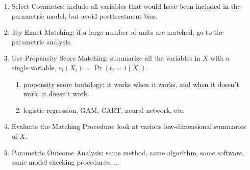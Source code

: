 \documentclass[20pt,landscape,pdftex]{foils}
\begin{document}
\begin{enumerate}
\item Select Covariates: include all variables that would have been
  included in the parametric model, but avoid posttreatment
  bias.\pause
  
\item Try Exact Matching: if a large number of units are matched, go
  to the parametric analysis.\pause
  
\item Use Propensity Score Matching: summarize all the variables in
  $X$ with a single variable, $e_i(X_i)=\Pr(t_i=1\mid X_i)$.\pause
  
  \begin{enumerate}
  \item propensity score tautology: it works when it works, and when
    it doesn't work, it doesn't work.\pause

  \item logistic regression, GAM, CART, neural network, etc.\pause
    
  \end{enumerate}

\item Evaluate the Matching Procedure: look at various low-dimensional
  summaries of $X$.\pause
\item Parametric Outcome Analysis: same method, same algorithm, same
  software, same model checking procedures, ... \pause
\end{enumerate}



\hypersetup{pdfpagetransition=Replace}
\end{document}
